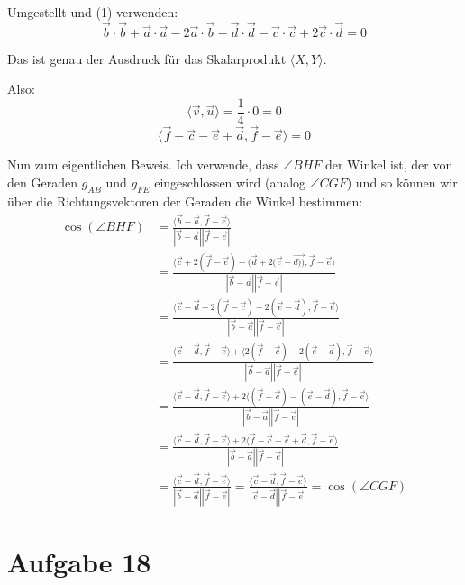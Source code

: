 \documentclass[12pt,a4paper]{article}
\begin{document}
\noindent Umgestellt und (1) verwenden:
\[
\vec{b} \cdot \vec{b} + \vec{a} \cdot \vec{a} - 2\vec{a} \cdot \vec{b} - \vec{d} \cdot \vec{d} - \vec{c} \cdot \vec{c} + 2\vec{c} \cdot \vec{d} = 0
\]

\noindent Das ist genau der Ausdruck für das Skalarprodukt $\langle X, Y \rangle$.

\noindent Also:
\[
\langle \vec{v}, \vec{u} \rangle = \frac{1}{4} \cdot 0 = 0
\]
\[
    \langle \vec{f} - \vec{c} - \vec{e} + \vec{d}, \vec{f} - \vec{e} \rangle = 0
\]

\noindent Nun zum eigentlichen Beweis. Ich verwende, dass $\angle BHF$ der Winkel ist, der von den Geraden $g_{AB}$ und $g_{FE}$ eingeschlossen wird (analog $\angle CGF$) und so können wir über die Richtungsvektoren der Geraden die Winkel bestimmen: \\
\begin{align*}
    \cos(\angle BHF) &= \frac{\langle \vec{b} - \vec{a}, \vec{f} - \vec{e} \rangle}{|\vec{b} - \vec{a}||\vec{f} - \vec{e}|}\\
                     &= \frac{\langle \vec{c} + 2(\vec{f} - \vec{e}) - (\vec{d} + 2(\vec{e} - \vec{d))}, \vec{f} - \vec{e} \rangle}{|\vec{b} - \vec{a}||\vec{f} - \vec{e}|}\\
                     &= \frac{\langle \vec{c} - \vec{d} + 2(\vec{f} - \vec{c}) - 2(\vec{e} - \vec{d}), \vec{f} - \vec{e} \rangle}{|\vec{b} - \vec{a}||\vec{f} - \vec{e}|}\\
                     &= \frac{\langle \vec{c} - \vec{d}, \vec{f} - \vec{e} \rangle + \langle 2(\vec{f} - \vec{c}) - 2(\vec{e} - \vec{d}), \vec{f} - \vec{e} \rangle}{|\vec{b} - \vec{a}||\vec{f} - \vec{e}|}\\
                     &= \frac{\langle \vec{c} - \vec{d}, \vec{f} - \vec{e} \rangle + 2\langle (\vec{f} - \vec{c}) - (\vec{e} - \vec{d}), \vec{f} - \vec{e} \rangle}{|\vec{b} - \vec{a}||\vec{f} - \vec{e}|}\\
                     &= \frac{\langle \vec{c} - \vec{d}, \vec{f} - \vec{e} \rangle + 2\langle \vec{f} - \vec{c} - \vec{e} + \vec{d}, \vec{f} - \vec{e} \rangle}{|\vec{b} - \vec{a}||\vec{f} - \vec{e}|}\\
                     &= \frac{\langle \vec{c} - \vec{d}, \vec{f} - \vec{e} \rangle}{|\vec{b} - \vec{a}||\vec{f} - \vec{e}|} = \frac{\langle \vec{c} - \vec{d}, \vec{f} - \vec{e} \rangle}{|\vec{c} - \vec{d}||\vec{f} - \vec{e}|} = \cos(\angle CGF)
\end{align*}

\newpage
\section*{Aufgabe 18}
\end{document}
